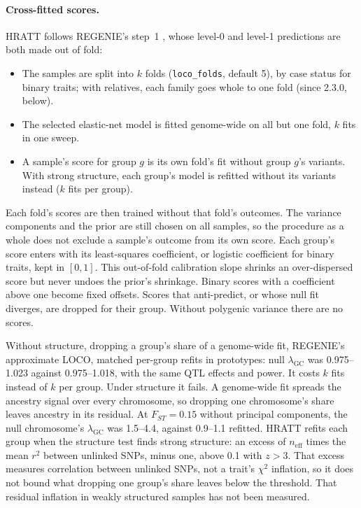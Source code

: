 \documentclass[11pt]{article}
\newcommand{\lgc}{\lambda_{\mathrm{GC}}}
\newcommand{\code}[1]{\texttt{#1}}
\begin{document}
\paragraph{Cross-fitted scores.}
HRATT follows REGENIE's step~1 \citep{mbatchou2021}, whose level-0 and
level-1 predictions are both made out of fold:
\begin{itemize}
 \item The samples are split into $k$ folds (\code{loco\_folds}, default
 5), by case status for binary traits; with relatives, each family goes
 whole to one fold (since 2.3.0, below).
 \item The selected elastic-net model is fitted genome-wide on all but one
 fold, $k$ fits in one sweep.
 \item A sample's score for group $g$ is its own fold's fit without group
 $g$'s variants. With strong structure, each group's model is refitted
 without its variants instead ($k$ fits per group).
\end{itemize}
Each fold's scores are then trained without that fold's outcomes. The
variance components and the prior are still chosen on all samples, so the
procedure as a whole does not exclude a sample's outcome from its own
score. Each group's score enters with its least-squares coefficient, or logistic coefficient for
binary traits, kept in $[0,1]$. This out-of-fold calibration slope
shrinks an over-dispersed score but never undoes the prior's shrinkage.
Binary scores with a coefficient above one become fixed offsets. Scores
that anti-predict, or whose null fit diverges, are dropped for their
group. Without polygenic variance there are no scores.

Without structure, dropping a group's share of a genome-wide fit,
REGENIE's approximate LOCO, matched per-group refits in prototypes: null $\lgc$ was 0.975--1.023 against
0.975--1.018, with the same QTL effects and power. It costs $k$ fits instead
of $k$ per group. Under structure it fails. A genome-wide fit spreads the
ancestry signal over every chromosome, so dropping one chromosome's share
leaves ancestry in its residual. At $F_{ST}=0.15$ without principal
components, the null chromosome's $\lgc$ was 1.5--4.4, against 0.9--1.1
refitted. HRATT refits each group when the structure test finds strong
structure: an excess of $n_\mathrm{eff}$ times the mean $r^2$ between
unlinked SNPs, minus one, above 0.1 with $z>3$. That excess measures
correlation between unlinked SNPs, not a trait's $\chi^2$ inflation, so it
does not bound what dropping one group's share leaves below the threshold.
That residual inflation in weakly structured samples has not been
measured.
\end{document}
